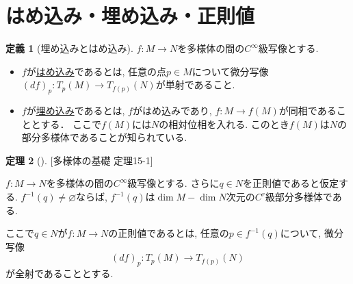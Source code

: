 \documentclass[dvipdfmx,a4paper,11pt]{article}
\theoremstyle{definition}
\newtheorem{thm}{定理}
\newtheorem{dfn}[thm]{定義}
\begin{document}


\section{はめ込み・埋め込み・正則値}


\begin{tcolorbox}[
    colback = white,
    colframe = green!35!black,
    fonttitle = \bfseries,
    breakable = true]
    \begin{dfn}[埋め込みとはめ込み]
    $f : M \rightarrow N$を多様体の間の$C^{\infty}$級写像とする. 
    \begin{itemize}
    \item $f$が\underline{はめ込み}であるとは, 任意の点$p \in M$について微分写像$(df)_{p} : T_{p}(M) \rightarrow T_{f(p)}(N)$が単射であること.
    \item $f$が\underline{埋め込み}であるとは, $f$がはめ込みであり, $f : M \rightarrow f(M)$が同相であることとする． ここで$f(M)$には$N$の相対位相を入れる. このとき$f(M)$は$N$の部分多様体であることが知られている. 
    \end{itemize}

    \end{dfn}
    \end{tcolorbox}
    
 \begin{tcolorbox}[
    colback = white,
    colframe = green!35!black,
    fonttitle = \bfseries,
    breakable = true]
    \begin{thm}[][多様体の基礎 定理15-1]
    \label{thm-regular}
    
$f : M \rightarrow N$を多様体の間の$C^{\infty}$級写像とする. さらに$q \in N$を正則値であると仮定する. 
$f^{-1}(q) \neq \varnothing $ならば, $f^{-1}(q) $は$\dim M - \dim N$次元の$C^r$級部分多様体である.

ここで$q \in N$が$f : M \rightarrow N$の正則値であるとは, 任意の$p \in f^{-1}(q)$について,
微分写像
$$
(df)_{p} : T_{p}(M) \rightarrow T_{f(p)}(N)
$$
が全射であることとする.
    \end{thm}
    \end{tcolorbox}
    
\end{document}
